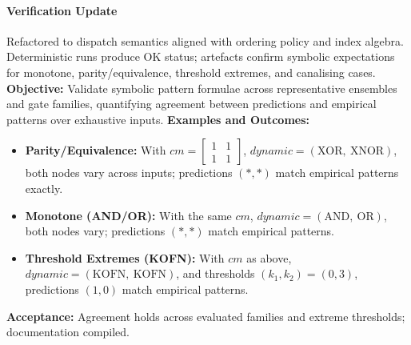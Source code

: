 \paragraph{Verification Update} Refactored to dispatch semantics aligned with ordering policy and index algebra. Deterministic runs produce OK status; artefacts confirm symbolic expectations for monotone, parity/equivalence, threshold extremes, and canalising cases.
\textbf{Objective:} Validate symbolic pattern formulae across representative ensembles and gate families, quantifying agreement between predictions and empirical patterns over exhaustive inputs.
\textbf{Examples and Outcomes:}
\begin{itemize}
\item \textbf{Parity/Equivalence:} With \(cm = \begin{bmatrix}1 & 1\\ 1 & 1\end{bmatrix}\), \(dynamic=(\text{XOR},\ \text{XNOR})\), both nodes vary across inputs; predictions \((* , *)\) match empirical patterns exactly.
\item \textbf{Monotone (AND/OR):} With the same \(cm\), \(dynamic=(\text{AND},\ \text{OR})\), both nodes vary; predictions \((* , *)\) match empirical patterns.
\item \textbf{Threshold Extremes (KOFN):} With \(cm\) as above, \(dynamic=(\text{KOFN},\ \text{KOFN})\), and thresholds \((k_1,k_2)=(0,3)\), predictions \((1, 0)\) match empirical patterns.
\end{itemize}
\textbf{Acceptance:} Agreement holds across evaluated families and extreme thresholds; documentation compiled.
